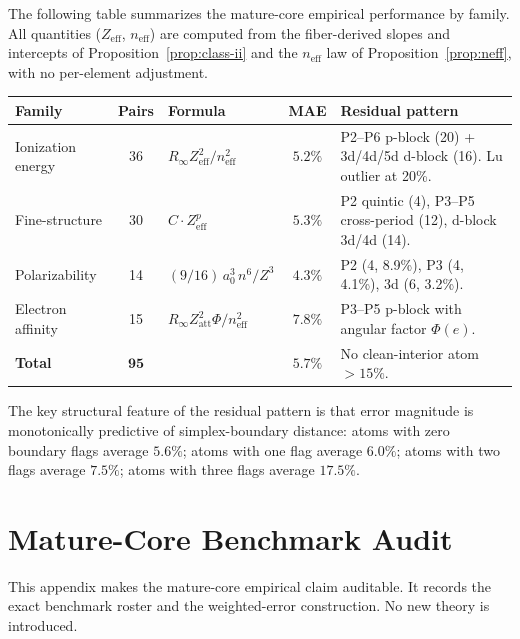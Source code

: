 \documentclass[11pt,a4paper]{article}
\begin{document}
The following table summarizes the mature-core empirical performance by family. All quantities ($Z_{\mathrm{eff}}$, $n_{\mathrm{eff}}$) are computed from the fiber-derived slopes and intercepts of Proposition~\ref{prop:class-ii} and the $n_{\mathrm{eff}}$ law of Proposition~\ref{prop:neff}, with no per-element adjustment.

\begin{center}
\small
\renewcommand{\arraystretch}{1.2}
\begin{tabular}{p{2.0cm}cp{2.4cm}cp{3.8cm}}
\toprule
Family & Pairs & Formula & MAE & Residual pattern \\
\midrule
Ionization energy & 36 & $R_\infty Z_{\mathrm{eff}}^2/n_{\mathrm{eff}}^2$ & $5.2\%$ & P2--P6 p-block (20) + 3d/4d/5d d-block (16). Lu outlier at 20\%. \\
Fine-structure & 30 & $C \cdot Z_{\mathrm{eff}}^p$ & $5.3\%$ & P2 quintic (4), P3--P5 cross-period (12), d-block 3d/4d (14). \\
Polarizability & 14 & $(9/16)\,a_0^3\, n^6/Z^3$ & $4.3\%$ & P2 (4, 8.9\%), P3 (4, 4.1\%), 3d (6, 3.2\%). \\
Electron affinity & 15 & $R_\infty Z_{\mathrm{att}}^2 \Phi/n_{\mathrm{eff}}^2$ & $7.8\%$ & P3--P5 p-block with angular factor $\Phi(e)$. \\
\midrule
\textbf{Total} & $\mathbf{95}$ & & $\mathbf{5.7\%}$ & No clean-interior atom $> 15\%$. \\
\bottomrule
\end{tabular}
\end{center}

The key structural feature of the residual pattern is that error magnitude is monotonically predictive of simplex-boundary distance: atoms with zero boundary flags average $5.6\%$; atoms with one flag average $6.0\%$; atoms with two flags average $7.5\%$; atoms with three flags average $17.5\%$.

\section{Mature-Core Benchmark Audit}
\label{app:mature-core-audit}

This appendix makes the mature-core empirical claim auditable. It records the exact benchmark roster and the weighted-error construction. No new theory is introduced.
\end{document}
